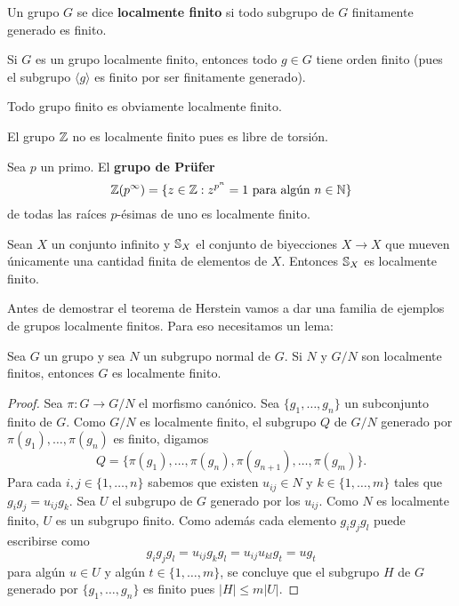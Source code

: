 \begin{definition}
	Un grupo $G$ se dice \textbf{localmente finito} si todo subgrupo de $G$
	finitamente generado es finito.
\end{definition}

Si $G$ es un grupo localmente finito, entonces todo $g\in G$ tiene orden finito
(pues el subgrupo $\langle g\rangle$ es finito por ser finitamente generado). 

\begin{example}
	Todo grupo finito es obviamente localmente finito.
\end{example}

\begin{example}
	El grupo $\mathbb{Z}$ no es localmente finito pues es libre de torsión.
\end{example}

\begin{example}
	Sea $p$ un primo.  El \textbf{grupo de Pr\"ufer}
	\[
		\mathbb{Z}(p^{\infty})=\{z\in\mathbb{Z}:z^{p^n}=1\text{ para algún $n\in\mathbb{N}$}\}
	\]
	de todas
	las raíces $p$-ésimas de uno es localmente finito.
\end{example}

\begin{example}
	Sean $X$ un conjunto infinito y $\mathbb{S}_X$ el conjunto de biyecciones $X\to
	X$ que mueven únicamente una cantidad finita de elementos de $X$. Entonces
	$\mathbb{S}_X$ es localmente finito.
\end{example}

Antes de demostrar el teorema de Herstein vamos a dar una familia de ejemplos
de grupos localmente finitos. Para eso necesitamos un lema:

\begin{lemma}
	\label{lem:solvable_torsion=>lf}
	Sea $G$ un grupo y sea $N$ un subgrupo normal de $G$. Si $N$ y $G/N$ son
	localmente finitos, entonces $G$ es localmente finito.
\end{lemma}

\begin{proof}
	Sea $\pi\colon G\to G/N$ el morfismo canónico. Sea $\{g_1,\dots,g_n\}$ un
	subconjunto finito de $G$. Como $G/N$ es localmente finito, el subgrupo $Q$
	de $G/N$ generado por $\pi(g_1),\dots,\pi(g_n)$ es finito, digamos
	\[
		Q=\{\pi(g_1),\dots,\pi(g_n),\pi(g_{n+1}),\dots,\pi(g_m)\}.
	\]
	Para cada $i,j\in\{1,\dots,n\}$ sabemos que existen $u_{ij}\in N$ y
	$k\in\{1,\dots,m\}$ tales que $g_ig_j=u_{ij}g_k$. Sea $U$ el subgrupo de
	$G$ generado por los $u_{ij}$. Como $N$ es localmente finito, $U$ es un
	subgrupo finito. Como además cada elemento $g_ig_jg_l$ puede escribirse como
	\[
		g_ig_jg_l=u_{ij}g_kg_l=u_{ij}u_{kl}g_t=ug_t
	\]
	para algún $u\in U$ y algún $t\in\{1,\dots,m\}$, se concluye que el
	subgrupo $H$ de $G$ generado por $\{g_1,\dots,g_n\}$ es finito pues
	$|H|\leq m|U|$. 
\end{proof}

